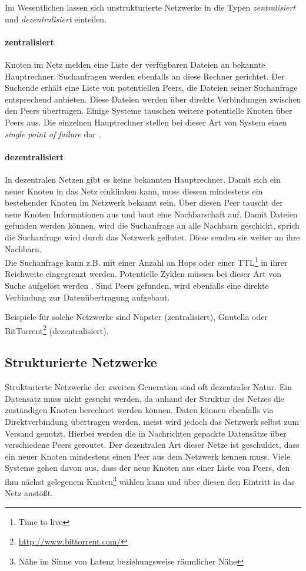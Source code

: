 Im Wesentlichen lassen sich unstrukturierte Netzwerke in die Typen \emph{zentralisiert} und \emph{dezentralisiert} einteilen.

\paragraph{zentralisiert} Knoten im Netz melden eine Liste der verfügbaren Dateien an bekannte Hauptrechner. Suchanfragen werden ebenfalls an diese Rechner gerichtet. Der Suchende erhält eine Liste von potentiellen Peers, die Dateien seiner Suchanfrage entsprechend anbieten. Diese Dateien werden über direkte Verbindungen zwischen den Peers übertragen. Einige Systeme tauschen weitere potentielle Knoten über Peers aus. Die einzelnen Hauptrechner stellen bei dieser Art von System einen \emph{single point of failure} dar \cite{Eberspaecher2005}.

\paragraph{dezentralisiert} In dezentralen Netzen gibt es keine bekannten Hauptrechner. Damit sich ein neuer Knoten in das Netz einklinken kann, muss diesem mindestens ein bestehender Knoten im Netzwerk bekannt sein. Über diesen Peer tauscht der neue Knoten Informationen aus und baut eine Nachbarschaft auf. Damit Dateien gefunden werden können, wird die Suchanfrage an alle Nachbarn geschickt, sprich die Suchanfrage wird durch das Netzwerk geflutet. Diese senden sie weiter an ihre Nachbarn.\\
Die Suchanfrage kann z.B. mit einer Anzahl an Hops oder einer TTL\footnote{Time to live} in ihrer Reichweite eingegrenzt werden. Potentielle Zyklen müssen bei dieser Art von Suche aufgelöst werden \cite{Lv2002}. Sind Peers gefunden, wird ebenfalls eine direkte Verbindung zur Datenübertragung aufgebaut. 

Beispiele für solche Netzwerke sind Napster (zentralisiert), Gnutella oder BitTorrent\footnote{\url{http://www.bittorrent.com/}} (dezentralisiert).

\subsection{Strukturierte Netzwerke}
Strukturierte Netzwerke der zweiten Generation sind oft dezentraler Natur. Ein Datensatz muss nicht gesucht werden, da anhand der Struktur des Netzes die zuständigen Knoten berechnet werden können. Daten können ebenfalls via Direktverbindung übertragen werden, meist wird jedoch das Netzwerk selbst zum Versand genutzt. Hierbei werden die in Nachrichten gepackte Datensätze über verschiedene Peers geroutet. Der dezentralen Art dieser Netze ist geschuldet, dass ein neuer Knoten mindestens einen Peer aus dem Netzwerk kennen muss. Viele Systeme gehen davon aus, dass der neue Knoten aus einer Liste von Peers, den ihm nächst gelegenem Knoten\footnote{Nähe im Sinne von Latenz beziehungsweise räumlicher Nähe} wählen kann und über diesen den Eintritt in das Netz anstößt.


